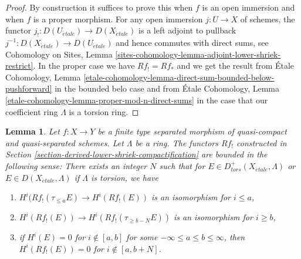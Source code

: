 \documentclass{stacks-project}
\theoremstyle{plain}
\newtheorem{lemma}[subsection]{Lemma}
\theoremstyle{definition}
\theoremstyle{remark}
\numberwithin{equation}{subsection}
\def\etale{{\acute{e}tale}}
\begin{document}
\begin{proof}
By construction it suffices to prove this when $f$ is an open immersion
and when $f$ is a proper morphism. For any open immersion $j : U \to X$
of schemes, the functor $j_! : D(U_\etale) \to D(X_\etale)$ is a left
adjoint to pullback $j^{-1} : D(X_\etale) \to D(U_\etale)$
and hence commutes with direct sums, see Cohomology on Sites, Lemma
\ref{sites-cohomology-lemma-adjoint-lower-shriek-restrict}.
In the proper case we have $Rf_! = Rf_*$ and we get the result from
\'Etale Cohomology, Lemma
\ref{etale-cohomology-lemma-direct-sum-bounded-below-pushforward}
in the bounded belo case and from
\'Etale Cohomology, Lemma \ref{etale-cohomology-lemma-proper-mod-n-direct-sums}
in the case that our coefficient ring $\Lambda$ is a torsion ring.
\end{proof}

\begin{lemma}
\label{lemma-derived-lower-shriek-bounded}
Let $f : X \to Y$ be a finite type separated morphism of quasi-compact
and quasi-separated schemes. Let $\Lambda$ be a ring. The functors $Rf_!$
constructed in Section \ref{section-derived-lower-shriek-compactification}
are bounded in the following sense: There exists an integer $N$ such that
for $E \in D^+_{tors}(X_\etale, \Lambda)$ or $E \in D(X_\etale, \Lambda)$
if $\Lambda$ is torsion, we have
\begin{enumerate}
\item $H^i(Rf_!(\tau_{\leq a}E) \to H^i(Rf_!(E))$ is an isomorphism
for $i \leq a$,
\item $H^i(Rf_!(E)) \to H^i(Rf_!(\tau_{\geq b - N}E))$ is an isomorphism
for $i \geq b$,
\item if $H^i(E) = 0$ for $i \not \in [a, b]$ for some
$-\infty \leq a \leq b \leq \infty$, then $H^i(Rf_!(E)) = 0$
for $i \not \in [a, b + N]$.
\end{enumerate}
\end{lemma}
\end{document}
